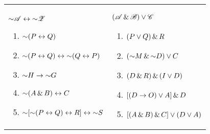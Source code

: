 \begin{exercises}
\begin{longtabu}{X[1,p,m]X[1,p,m]}
\item $\mathord{\sim} \mathscr{A} \leftrightarrow \mathord{\sim} \mathscr{Z}$
	\begin{enumerate}[label=\alph*.]
	\item $\mathord{\sim} (P \leftrightarrow Q)$
	\item $\mathord{\sim}(P \leftrightarrow Q) \leftrightarrow \mathord{\sim} (Q \leftrightarrow P)$
	\item $\mathord{\sim} H \rightarrow \mathord{\sim} G$
	\item $\mathord{\sim} (A \,\&\, B) \leftrightarrow C$
	\item \begin{flushleft} $\mathord{\sim} [\mathord{\sim} (P \leftrightarrow Q) \leftrightarrow R] \leftrightarrow \mathord{\sim} S$ \end{flushleft}
	\end{enumerate}


&

\item $(\mathscr{A} \,\&\, \mathscr{B}) \vee \mathscr{C}$
	\begin{enumerate}[label=\alph*.]
	\item $(P \vee Q) \,\&\, R$
	\item $(\mathord{\sim} M \,\&\, \mathord{\sim} D) \vee C$
	\item $(D \,\&\, R) \,\&\, (I \vee D)$
	\item $[(D \rightarrow O) \vee A] \,\&\, D$
	\item $[(A \,\&\, B) \,\&\, C] \vee (D \vee A)$
	\end{enumerate}




\end{longtabu}
\end{exercises}
